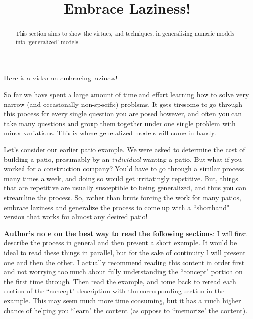 \documentclass{ximera}
\title{Embrace Laziness!}
\begin{document}
\begin{abstract}
    This section aims to show the virtues, and techniques, in generalizing numeric models into `generalized' models.
\end{abstract}
\maketitle

Here is a video on embracing laziness!


So far we have spent a large amount of time and effort learning how to solve very narrow (and occasionally non-specific) problems. It gets tiresome to go through this process for every single question you are posed however, and often you can take many questions and group them together under one single problem with minor variations. This is where generalized models will come in handy.

Let's consider our earlier patio example. We were asked to determine the cost of building a patio, presumably by an \textit{individual} wanting a patio. But what if you worked for a construction company? You'd have to go through a similar process many times a week, and doing so would get irritatingly repetitive. But, things that are repetitive are usually susceptible to being generalized, and thus you can streamline the process. So, rather than brute forcing the work for many patios, embrace laziness and generalize the process to come up with a ``shorthand" version that works for almost any desired patio!

\textbf{Author's note on the best way to read the following sections}: I will first describe the process in general and then present a short example. It would be ideal to read these things in parallel, but for the sake of continuity I will present one and then the other. I actually recommend reading this content in order first and not worrying too much about fully understanding the ``concept" portion on the first time through. Then read the example, and come back to reread each section of the ``concept" description with the corresponding section in the example. This may seem much more time consuming, but it has a much higher chance of helping you ``learn" the content (as oppose to ``memorize" the content).
\end{document}
